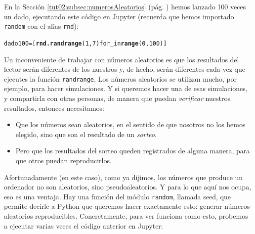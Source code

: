 \documentclass[10pt,a4paper]{article}\usepackage[]{graphicx}\usepackage[]{color}
\makeatletter
\newcommand{\hlkwd}[1]{\textcolor[rgb]{0.737,0.353,0.396}{\textbf{#1}}}%
\newenvironment{kframe}{%
 \def\at@end@of@kframe{}%
 \ifinner\ifhmode%
  \def\at@end@of@kframe{\end{minipage}}%
  \begin{minipage}{\columnwidth}%
 \fi\fi%
 \def\FrameCommand##1{\hskip\@totalleftmargin \hskip-\fboxsep
 \colorbox{shadecolor}{##1}\hskip-\fboxsep
     \hskip-\linewidth \hskip-\@totalleftmargin \hskip\columnwidth}%
 \MakeFramed {\advance\hsize-\width
   \@totalleftmargin\z@ \linewidth\hsize
   \@setminipage}}%
 {\par\unskip\endMakeFramed%
 \at@end@of@kframe}
\newenvironment{knitrout}{}{} %
\makeatother
\begin{document}
En la  Sección \ref{tut02:subsec:numerosAleatorios} (pág. \pageref{tut02:subsec:numerosAleatorios}) hemos lanzado 100 veces un dado,  ejecutando este código en Jupyter (recuerda que hemos importado {\tt random} con el alias {\tt rnd}):
\begin{knitrout}
\color{fgcolor}\begin{kframe}
\begin{alltt}
dado100 = [\hlkwd{rnd.randrange}(1, 7) for _ in \hlkwd{range}(0, 100)]
\end{alltt}
\end{kframe}
\end{knitrout}
Un inconveniente de trabajar con números aleatorios es que los resultados del lector serán diferentes de los nuestros y, de hecho, serán diferentes cada vez que ejecutes la función {\tt randrange}. Los números aleatorios se utilizan mucho, por ejemplo, para hacer simulaciones. Y si queremos hacer una de esas simulaciones, y compartirla con otras personas, de manera que puedan {\em verificar} nuestros resultados, entonces necesitamos:
\begin{itemize}
  \item Que los números sean aleatorios, en el sentido de que nosotros no los hemos elegido, sino que son el resultado de un {\em sorteo}.
  \item Pero que los resultados del sorteo queden registrados de alguna manera, para que otros puedan reproducirlos.
\end{itemize}
Afortunadamente (en este caso), como ya dijimos, los números que produce un ordenador no son aleatorios, sino pseudoaleatorios. Y para lo que aquí nos ocupa, eso es una ventaja. Hay una función del módulo {\tt random}, llamada {\sf seed}, que permite decirle a Python que queremos hacer exactamente esto: generar números aleatorios reproducibles. Concretamente, para ver funciona como esto, probemos a ejecutar varias veces el código anterior en Jupyter:
\end{document}

